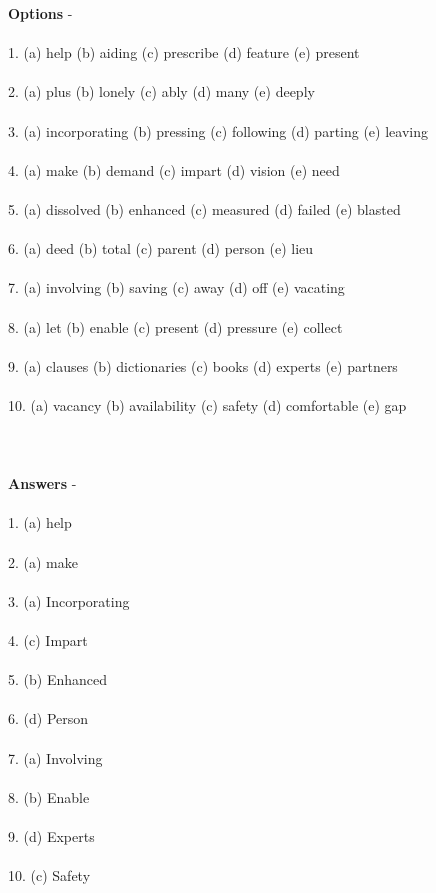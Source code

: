 \documentclass[a4paper,30pt]{report}
\begin{document}
      \textbf{Options} -\\\\ 
1. (a) help (b) aiding
(c) prescribe (d) feature
(e) present\\\\
2. (a) plus (b) lonely
(c) ably (d) many
(e) deeply\\\\
3. (a) incorporating (b) pressing
(c) following (d) parting
(e) leaving\\\\
4. (a) make (b) demand
(c) impart (d) vision
(e) need\\\\
5. (a) dissolved (b) enhanced
(c) measured (d) failed
(e) blasted\\\\
6. (a) deed (b) total
(c) parent (d) person
(e) lieu\\\\
7. (a) involving (b) saving
(c) away (d) off
(e) vacating\\\\
8. (a) let (b) enable
(c) present (d) pressure
(e) collect\\\\
9. (a) clauses (b) dictionaries
(c) books (d) experts
(e) partners\\\\
10. (a) vacancy (b) availability
(c) safety (d) comfortable
(e) gap\\\\\\\\

     \textbf{Answers} - \\\\
1. (a) help\\\\
2. (a) make \\\\
3. (a) Incorporating\\\\
4. (c) Impart \\\\
5. (b) Enhanced \\\\
6. (d) Person \\\\
7. (a) Involving\\\\
8. (b) Enable \\\\
9. (d) Experts \\\\
10. (c) Safety \\\\
\end{document}
